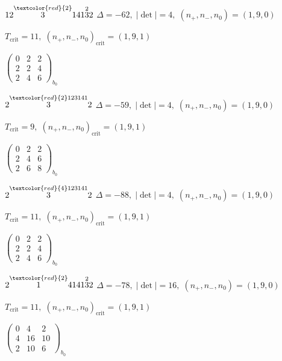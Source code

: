 \documentclass[10pt]{article}
\begin{document}
\smallskip

$12\overset{\textcolor{red}{2}}{3}141\overset{2}{3}2$ \quad $\Delta=-62,\; |\det|=4,\; (n_+,n_-,n_0)=(1,9,0)$

\hspace{1em}$T_{\text{crit}}=11,\; (n_+,n_-,n_0)_{\text{crit}}=(1,9,1)$

\hspace{2em}$\left(\begin{smallmatrix}0 & 2 & 2 \\ 2 & 2 & 4 \\ 2 & 4 & 6\end{smallmatrix}\right)_{\!b_0}$

$2\overset{\textcolor{red}{2}123141}{3}2$ \quad $\Delta=-59,\; |\det|=4,\; (n_+,n_-,n_0)=(1,9,0)$

\hspace{1em}$T_{\text{crit}}=9,\; (n_+,n_-,n_0)_{\text{crit}}=(1,9,1)$

\hspace{2em}$\left(\begin{smallmatrix}0 & 2 & 2 \\ 2 & 4 & 6 \\ 2 & 6 & 8\end{smallmatrix}\right)_{\!b_0}$

$2\overset{\textcolor{red}{4}123141}{3}2$ \quad $\Delta=-88,\; |\det|=4,\; (n_+,n_-,n_0)=(1,9,0)$

\hspace{1em}$T_{\text{crit}}=11,\; (n_+,n_-,n_0)_{\text{crit}}=(1,9,1)$

\hspace{2em}$\left(\begin{smallmatrix}0 & 2 & 2 \\ 2 & 2 & 4 \\ 2 & 4 & 6\end{smallmatrix}\right)_{\!b_0}$

\smallskip

$2\overset{\textcolor{red}{2}}{1}4141\overset{2}{3}2$ \quad $\Delta=-78,\; |\det|=16,\; (n_+,n_-,n_0)=(1,9,0)$

\hspace{1em}$T_{\text{crit}}=11,\; (n_+,n_-,n_0)_{\text{crit}}=(1,9,1)$

\hspace{2em}$\left(\begin{smallmatrix}0 & 4 & 2 \\ 4 & 16 & 10 \\ 2 & 10 & 6\end{smallmatrix}\right)_{\!b_0}$
\end{document}
